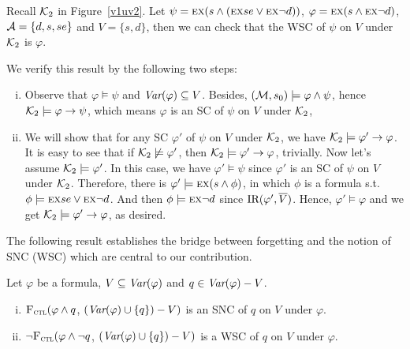 \documentclass[twoside,11pt]{article}
\begin{document}
	\begin{example}\label{examp:WSC}
		Recall ${\cal K}_2$ in Figure~\ref{v1uv2}. Let $\psi = \textsc{e} \textsc{x}(s \wedge (\textsc{e} \textsc{x} se \vee \textsc{e} \textsc{x} \neg d))$, $\varphi = \textsc{e} \textsc{x}(s \wedge \textsc{e} \textsc{x} \neg d)$, ${\cal A} =\{d, s, se\}$ and $V = \{s, d\}$, then we can check  that the WSC of $\psi$ on $V$ under ${\cal K}_2$ is $\varphi$.
		
		We verify this result by the following two steps:
		\begin{enumerate}[(i)]
			\item Observe that $\varphi \models \psi$ and $\textit{Var}(\varphi) \subseteq V$. Besides, $({\cal M}, s_0) \models \varphi \wedge \psi$, hence ${\cal K}_2 \models \varphi \rightarrow \psi$, which means $\varphi$ is an SC of $\psi$ on $V$ under ${\cal K}_2$,
			\item We will show that for any SC $\varphi'$ of $\psi$ on $V$ under ${\cal K}_2$,  we have ${\cal K}_2 \models \varphi' \rightarrow \varphi$. It is easy to see that if ${\cal K}_2 \not \models \varphi'$, then ${\cal K}_2\models \varphi' \rightarrow \varphi$, trivially. Now let's assume ${\cal K}_2 \models \varphi'$. In this case, we have $\varphi' \models \psi$ since $\varphi'$ is an SC of $\psi$ on $V$ under ${\cal K}_2$. Therefore, there is $\varphi' \models \textsc{e} \textsc{x}(s \wedge \phi)$, in which $\phi$ is a formula s.t.  $\phi\models \textsc{e} \textsc{x} se \vee \textsc{e} \textsc{x} \neg d$. And then $\phi \models \textsc{e} \textsc{x} \neg d$ since $\textrm{IR}(\varphi', \overline V)$. Hence, $\varphi' \models \varphi$ and we get  ${\cal K}_2 \models \varphi' \rightarrow \varphi$, as desired.
		\end{enumerate}
	\end{example}
	
	The following result establishes the bridge between forgetting and the notion of SNC (WSC) which are central to our contribution.
	
	\begin{theorem}\label{thm:SNC:WSC:forget}
		Let $\varphi$ be a formula, $V\subseteq\textit{Var}(\varphi)$ and $q\in\textit{Var}(\varphi)- V$.
		\begin{enumerate}[(i)]
			\item ${\textsc{F}_{\textsc{ctl}}} (\varphi \land q$, $(\textit{Var}(\varphi) \cup \{q\}) - V)$
			is an SNC of $q$ on $V$ under $\varphi$.
			\item  $\neg{\textsc{F}_{\textsc{ctl}}} (\varphi \land \neg q$, $(\textit{Var}(\varphi) \cup \{q\}) - V)$
			is a WSC of $q$ on $V$ under $\varphi$.
		\end{enumerate}
	\end{theorem}
	
\end{document}
